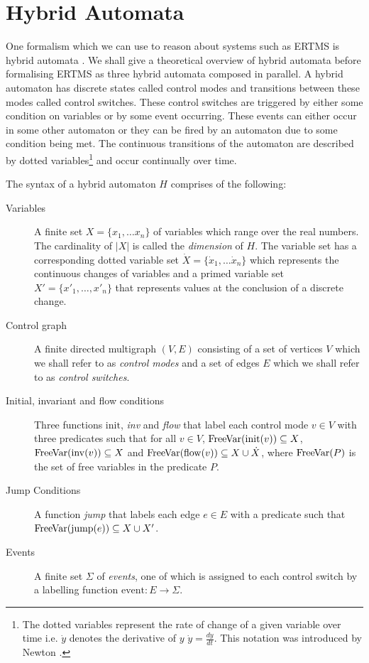\section{Hybrid Automata} \label{sec:hybrid}
One formalism which we can use to reason about systems such as ERTMS is hybrid automata \cite{TH96}. We shall give a theoretical overview of hybrid automata before formalising ERTMS as three hybrid automata composed in parallel. A hybrid automaton has discrete states called control modes and transitions between these modes called control switches. These control switches are triggered by either some condition on variables or by some event occurring. These events can either occur in some other automaton or they can be fired by an automaton due to some condition being met. The continuous transitions of the automaton are described by dotted variables\footnote{The dotted variables represent the rate of change of a given variable over time i.e. $\dot{y}$ denotes the derivative of $y$  $\dot{y} = \frac{dy}{dt}$. This notation was introduced by Newton \cite{CF28}.} and occur continually over time.
\medskip
\begin{mydef}\label{def:hybridautomatonsyntax}
The syntax of a hybrid automaton $H$ comprises of the following:
\begin{description}
\item[Variables] A finite set $X = \{x_1, \ldots x_n \}$ of variables which range over the real numbers. The cardinality of $|X|$ is called the \emph{dimension} of $H$. The variable set has a corresponding dotted variable set $\dot{X} = \{\dot{x}_1, \ldots \dot{x}_n \}$ which represents the continuous changes of variables and a primed variable set $X' = \{x'_1, \ldots , x'_n \}$ that represents  values at the conclusion of a discrete change.

\item[Control graph] A finite directed multigraph $(V,E)$ consisting of a set of vertices $V$ which we shall refer to as \emph{control modes} and a set of edges $E$ which we shall refer to as \emph{control switches}.

\item[Initial, invariant and flow conditions] Three functions $\mathrm{init}$, \emph{inv} and \emph{flow} that label each control mode $v \in V$ with three predicates such that for all $v \in V$, $\mathrm{FreeVar}(\mathrm{init}(v)) \subseteq X$, $\mathrm{FreeVar}(\mathrm{inv}(v)) \subseteq X$ and $\mathrm{FreeVar}(\mathrm{flow}(v)) \subseteq X \cup \dot{X}$, where $\mathrm{FreeVar}(P)$ is the set of free variables in the predicate $P$.


\item[Jump Conditions] A function \emph{jump} that labels each edge $e \in E$ with a predicate such that $\mathrm{FreeVar}(\mathrm{jump}(e)) \subseteq X \cup X' $.

\item[Events] A finite set $\Sigma$ of \emph{events}, one of which is assigned to  each control switch by a labelling function $\mathrm{event}: E \to \Sigma$.

\end{description}

\end{mydef}
